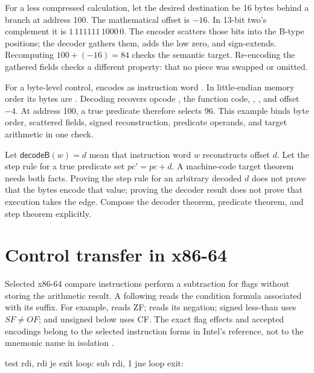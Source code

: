 For a less compressed calculation, let the desired destination be 16 bytes
behind a branch at address 100. The mathematical offset is \(-16\). In 13-bit
two's complement it is \(1\,111111\,1000\,0\). The encoder scatters those
bits into the B-type positions; the decoder gathers them, adds the low
zero, and sign-extends. Recomputing \(100+(-16)=84\) checks the semantic
target. Re-encoding the gathered fields checks a different property: that no
piece was swapped or omitted.

For a byte-level control,  encodes as instruction word
. In little-endian memory order its bytes are
. Decoding recovers opcode , the 
function code,
, , and offset \(-4\). At address 100, a true
predicate therefore selects 96. This example binds byte order, scattered
fields, signed reconstruction, predicate operands, and target arithmetic in
one check.

\begin{proofkit}[title={Decoder-to-target composition}]
Let \(\mathsf{decodeB}(w)=d\) mean that instruction word \(w\) reconstructs
offset \(d\). Let the step rule for a true predicate set \(pc'=pc+d\). A
machine-code target theorem needs both facts. Proving the step rule for an
arbitrary decoded \(d\) does not prove that the bytes encode that value;
proving the decoder result does not prove that execution takes the edge.
Compose the decoder theorem, predicate theorem, and step theorem explicitly.
\end{proofkit}

\section{Control transfer in x86-64}

Selected x86-64 compare instructions perform a subtraction for flags without
storing the arithmetic result. A following  reads the condition
formula associated with its suffix. For example,  reads ZF;
 reads its negation; signed less-than uses \(SF\ne OF\); and
unsigned below uses CF. The exact flag effects and accepted encodings belong
to the selected instruction forms in Intel's reference, not to the mnemonic
name in isolation \autocite{intel2026sdm2}.

\begin{codelisting}[language={},caption={x86-64 counts RDI down to zero}]
    test rdi, rdi
    je   exit
loop:
    sub  rdi, 1
    jne  loop
exit:
\end{codelisting}

